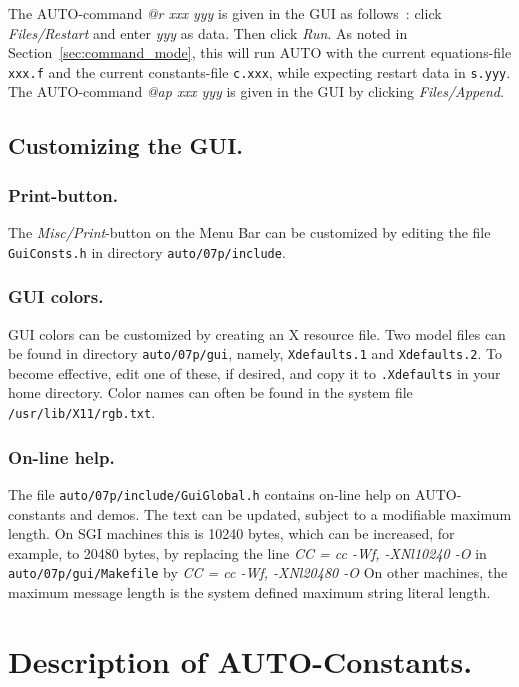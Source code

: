\documentclass[12pt]{report}
\begin{document}
The {\cal AUTO}-command {\it @r xxx yyy} is given in the GUI as follows~:
click {\it Files/Restart} and enter {\it yyy} as data.
Then click {\it Run}.
As noted in Section~\ref{sec:command_mode}, 
this will run {\cal AUTO} with the current equations-file
{\tt xxx.f} and the current constants-file {\tt c.xxx}, 
while expecting restart data in {\tt s.yyy}.
The {\cal AUTO}-command {\it @ap xxx yyy} is given in the GUI by
clicking {\it Files/Append}.

\section{ Customizing the GUI.} \label{sec:Customizing_the_GUI}
\subsection{ Print-button.}
The {\it Misc/Print}-button on the Menu Bar can be customized 
by editing the file {\tt GuiConsts.h} in directory {\tt auto/07p/include}.

\subsection{ GUI colors.}
GUI colors can be customized by creating an X resource file.
Two model files can be found in directory {\tt auto/07p/gui}, namely,
{\tt Xdefaults.1} and {\tt Xdefaults.2}.
To become effective, edit one of these, if desired,
and copy it to {\tt .Xdefaults} in your home directory.
Color names can often be found in the system file {\tt /usr/lib/X11/rgb.txt}.

\subsection{ On-line help.}
The file {\tt auto/07p/include/GuiGlobal.h}
contains on-line help on {\cal AUTO}-constants and demos.
The text can be updated, subject to a modifiable maximum length.
On SGI machines this is 10240 bytes,
which can be increased, for example, to 20480 bytes, 
by replacing the line
{\it CC = cc -Wf, -XNl10240 -O}
in {\tt auto/07p/gui/Makefile} by
{\it CC = cc -Wf, -XNl20480 -O}
On other machines, the maximum message length is the system defined maximum
string literal length.


\chapter{ Description of {\cal AUTO}-Constants.} \label{ch:AUTO_constants}
\end{document}
